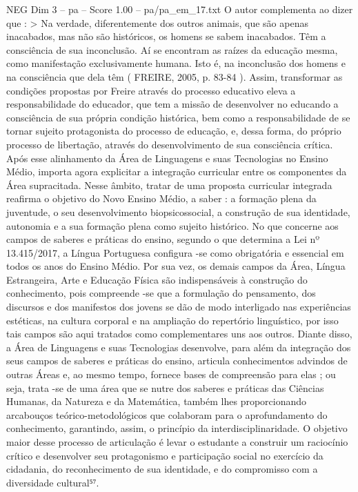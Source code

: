 \begin{textsample}{NEG Dim 3 – pa – Score 1.00 – pa/pa\_em\_17.txt}
O autor complementa ao dizer que : > Na verdade, diferentemente dos outros animais, que são apenas inacabados, mas não são históricos, os homens se sabem inacabados.
Têm a consciência de sua inconclusão.
Aí se encontram as raízes da educação mesma, como manifestação exclusivamente humana.
Isto é, na inconclusão dos homens e na consciência que dela têm ( FREIRE, 2005, p. 83-84 ).
Assim, transformar as condições propostas por Freire através do processo educativo eleva a responsabilidade do educador, que tem a missão de desenvolver no educando a consciência de sua própria condição histórica, bem como a responsabilidade de se tornar sujeito protagonista do processo de educação, e, dessa forma, do próprio processo de libertação, através do desenvolvimento de sua consciência crítica.
Após esse alinhamento da Área de Linguagens e suas Tecnologias no Ensino Médio, importa agora explicitar a integração curricular entre os componentes da Área supracitada.
Nesse âmbito, tratar de uma proposta curricular integrada reafirma o objetivo do Novo Ensino Médio, a saber : a formação plena da juventude, o seu desenvolvimento biopsicossocial, a construção de sua identidade, autonomia e a sua formação plena como sujeito histórico.
No que concerne aos campos de saberes e práticas do ensino, segundo o que determina a Lei nº 13.415/2017, a Língua Portuguesa configura -se como obrigatória e essencial em todos os anos do Ensino Médio.
Por sua vez, os demais campos da Área, Língua Estrangeira, Arte e Educação Física são indispensáveis à construção do conhecimento, pois compreende -se que a formulação do pensamento, dos discursos e dos manifestos dos jovens se dão de modo interligado nas experiências estéticas, na cultura corporal e na ampliação do repertório linguístico, por isso tais campos são aqui tratados como complementares uns aos outros.
Diante disso, a Área de Linguagens e suas Tecnologias desenvolve, para além da integração dos seus campos de saberes e práticas do ensino, articula conhecimentos advindos de outras Áreas e, ao mesmo tempo, fornece bases de compreensão para elas ; ou seja, trata -se de uma área que se nutre dos saberes e práticas das Ciências Humanas, da Natureza e da Matemática, também lhes proporcionando arcabouços teórico-metodológicos que colaboram para o aprofundamento do conhecimento, garantindo, assim, o princípio da interdisciplinaridade.
O objetivo maior desse processo de articulação é levar o estudante a construir um raciocínio crítico e desenvolver seu protagonismo e participação social no exercício da cidadania, do reconhecimento de sua identidade, e do compromisso com a diversidade cultural⁵⁷.

\end{textsample}
